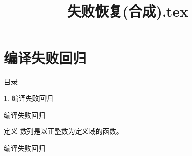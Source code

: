 \documentclass[aspectratio=169,10pt,fontset=fandol]{ctexbeamer}
\title{失败恢复(合成).tex}
\begin{document}
\section{编译失败回归}
\begin{frame}[t,fragile]{目录}
\normalsize
{\color{blue}\normalsize 1. 编译失败回归\par}\vspace{0.3em}
\end{frame}
\begin{frame}[t,fragile]{编译失败回归}
\normalsize
\begin{block}{定义}
{\normalsize
数列是以正整数为定义域的函数。
}
\end{block}
\end{frame}
\begin{frame}[t,fragile]{编译失败回归}
\normalsize
{\normalsize

\undefinedMathAgentFailure

}
\end{frame}
\end{document}
